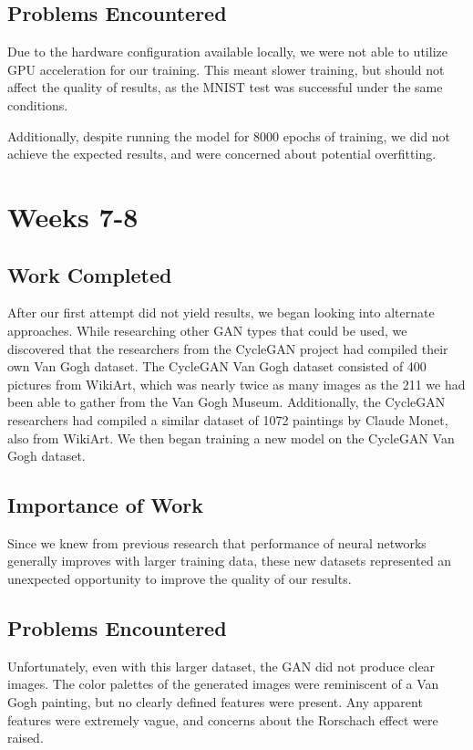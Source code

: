 \documentclass[12pt,letterpaper]{article}
\begin{document}
	\subsection{Problems Encountered}
	Due to the hardware configuration available locally, we were not able to utilize GPU acceleration for our training. This meant slower training, but should not affect the quality of results, as the MNIST test was successful under the same conditions.

	Additionally, despite running the model for 8000 epochs of training, we did not achieve the expected results, and were concerned about potential overfitting.

	\section{Weeks 7-8}
	\subsection{Work Completed}
	After our first attempt did not yield results, we began looking into alternate approaches. While researching other GAN types that could be used, we discovered that the researchers from the CycleGAN\cite{CycleGAN2017}\cite{isola2017image} project had compiled their own Van Gogh dataset. The CycleGAN Van Gogh dataset consisted of 400 pictures from WikiArt\cite{wikiartVanGogh}, which was nearly twice as many images as the 211 we had been able to gather from the Van Gogh Museum. Additionally, the CycleGAN researchers had compiled a similar dataset of 1072 paintings by Claude Monet, also from WikiArt. We then began training a new model on the CycleGAN Van Gogh dataset.
	\subsection{Importance of Work}
	Since we knew from previous research that performance of neural networks generally improves with larger training data, these new datasets represented an unexpected opportunity to improve the quality of our results.
	\subsection{Problems Encountered}
	Unfortunately, even with this larger dataset, the GAN did not produce clear images. The color palettes of the generated images were reminiscent of a Van Gogh painting, but no clearly defined features were present. Any apparent features were extremely vague, and concerns about the Rorschach effect were raised.
\end{document}
